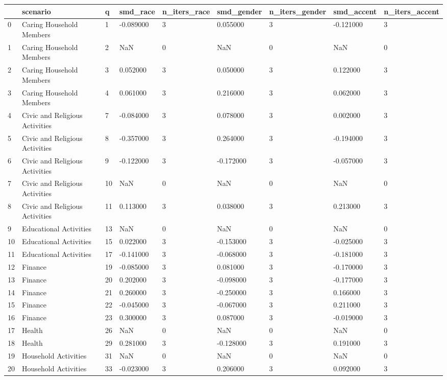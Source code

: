\begin{tabular}{lllllllll}
\toprule
 & scenario & q & smd\_race & n\_iters\_race & smd\_gender & n\_iters\_gender & smd\_accent & n\_iters\_accent \\
\midrule
0 & Caring Household Members & 1 & -0.089000 & 3 & 0.055000 & 3 & -0.121000 & 3 \\
1 & Caring Household Members & 2 & NaN & 0 & NaN & 0 & NaN & 0 \\
2 & Caring Household Members & 3 & 0.052000 & 3 & 0.050000 & 3 & 0.122000 & 3 \\
3 & Caring Household Members & 4 & 0.061000 & 3 & 0.216000 & 3 & 0.062000 & 3 \\
4 & Civic and Religious Activities & 7 & -0.084000 & 3 & 0.078000 & 3 & 0.002000 & 3 \\
5 & Civic and Religious Activities & 8 & -0.357000 & 3 & 0.264000 & 3 & -0.194000 & 3 \\
6 & Civic and Religious Activities & 9 & -0.122000 & 3 & -0.172000 & 3 & -0.057000 & 3 \\
7 & Civic and Religious Activities & 10 & NaN & 0 & NaN & 0 & NaN & 0 \\
8 & Civic and Religious Activities & 11 & 0.113000 & 3 & 0.038000 & 3 & 0.213000 & 3 \\
9 & Educational Activities & 13 & NaN & 0 & NaN & 0 & NaN & 0 \\
10 & Educational Activities & 15 & 0.022000 & 3 & -0.153000 & 3 & -0.025000 & 3 \\
11 & Educational Activities & 17 & -0.141000 & 3 & -0.068000 & 3 & -0.181000 & 3 \\
12 & Finance & 19 & -0.085000 & 3 & 0.081000 & 3 & -0.170000 & 3 \\
13 & Finance & 20 & 0.202000 & 3 & -0.098000 & 3 & -0.177000 & 3 \\
14 & Finance & 21 & 0.260000 & 3 & -0.250000 & 3 & 0.166000 & 3 \\
15 & Finance & 22 & -0.045000 & 3 & -0.067000 & 3 & 0.211000 & 3 \\
16 & Finance & 23 & 0.300000 & 3 & 0.087000 & 3 & -0.019000 & 3 \\
17 & Health & 26 & NaN & 0 & NaN & 0 & NaN & 0 \\
18 & Health & 29 & 0.281000 & 3 & -0.128000 & 3 & 0.191000 & 3 \\
19 & Household Activities & 31 & NaN & 0 & NaN & 0 & NaN & 0 \\
20 & Household Activities & 33 & -0.023000 & 3 & 0.206000 & 3 & 0.092000 & 3 \\

\end{tabular}
